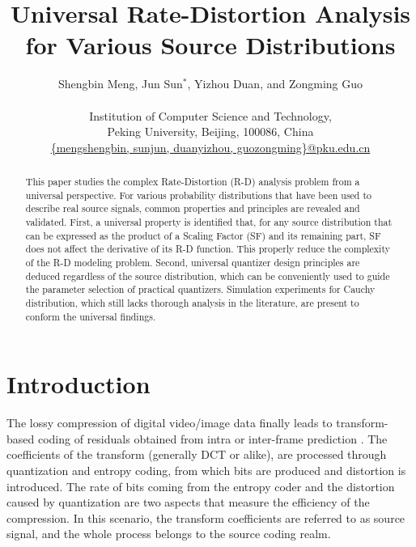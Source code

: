 \documentclass[smallabstract,smallcaptions]{dccpaper}
\begin{document}
\title
{\large
\textbf{Universal Rate-Distortion Analysis for Various Source Distributions}
}

\author{%
Shengbin Meng, Jun Sun$^{\ast}$, Yizhou Duan, and Zongming Guo\\[0.5em]
{\small\begin{minipage}{\linewidth}\begin{center}
\begin{tabular}{ccc}
Institution of Computer Science and Technology, \\
Peking University, Beijing, 100086, China\\
\url{{mengshengbin, sunjun, duanyizhou, guozongming}@pku.edu.cn}
\end{tabular}
\end{center}\end{minipage}}
}

\maketitle
\thispagestyle{empty}

\begin{abstract}
This paper studies the complex Rate-Distortion (R-D) analysis problem from a universal perspective. For various probability distributions that have been used to describe real source signals, common properties and principles are revealed and validated. First, a universal property is identified that, for any source distribution that can be expressed as the product of a Scaling Factor (SF) and its remaining part, SF does not affect the derivative of its R-D function. This properly reduce the complexity of the R-D modeling problem. Second, universal quantizer design principles are deduced regardless of the source distribution, which can be conveniently used to guide the parameter selection of practical quantizers. Simulation experiments for Cauchy distribution, which still lacks thorough analysis in the literature, are present to conform the universal findings.
\end{abstract}

\section{Introduction}

\let\thefootnote\relax{}

The lossy compression of digital video/image data finally leads to transform-based coding of residuals obtained from intra or inter-frame prediction \cite{Sullivan_IEEE2005}. The coefficients of the transform (generally DCT or alike), are processed through quantization and entropy coding, from which bits are produced and distortion is introduced. The rate of bits coming from the entropy coder and the distortion caused by quantization are two aspects that measure the efficiency of the compression. In this scenario, the transform coefficients are referred to as source signal, and the whole process belongs to the source coding realm.
\end{document}
